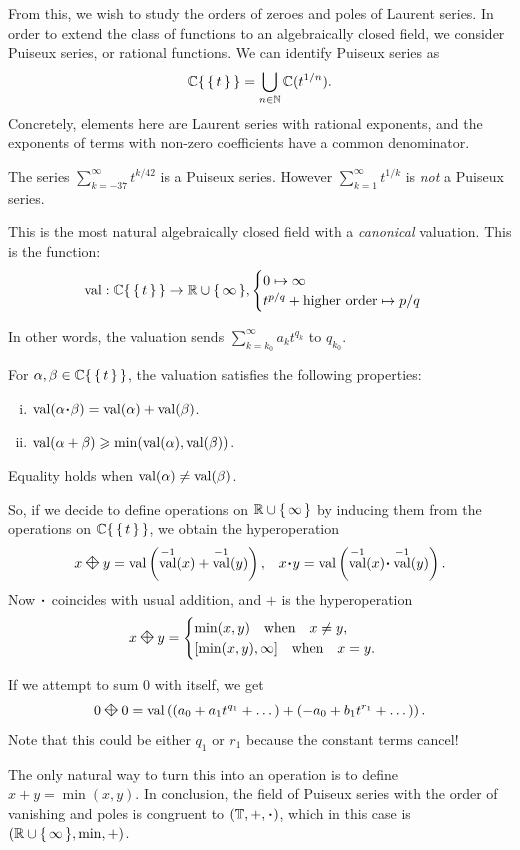 \documentclass[12pt]{memoir}
\DeclareMathOperator{\val}{val}
\newcommand{\diamondplus}{\mathbin{\rotatebox[origin=c]{45}{$\boxtimes$}}} %
\theoremstyle{definition}
\def\al{\alpha}
\begin{document}
From this, we wish to study the orders of zeroes and poles of Laurent series. In order to extend the class of functions to an algebraically closed field, we consider Puiseux series, or rational functions. We can identify Puiseux series as 
$$\mathbb{C}\{\,\{\,t\,\}\,\}=\bigcup_{n\in\mathbb{N}}\mathbb{C}(t^{1/n}).$$
Concretely, elements here are Laurent series with rational exponents, and the exponents of terms with non-zero coefficients have a common denominator. 
\begin{Ex}
    The series $\sum_{k=-37}^{\infty}t^{k/42}$ is a Puiseux series. However $\sum_{k=1}^\infty t^{1/k}$ is \emph{not} a Puiseux series.
\end{Ex}
This is the most natural algebraically closed field with a \emph{canonical} valuation. This is the function:
$$\val: \bC\set{\set{t}}\to\bR\cup\set{\infty},\begin{cases}
    0\mapsto\infty\\
    t^{p/q}+\text{higher order}\mapsto p/q
\end{cases}$$

In other words, the valuation sends $\sum_{k=k_0}^\infty a_kt^{q_k}$ to $q_{k_0}$.

\begin{Prop}\label{prop:PropertiesOfValuation}
For $\al,\bt\in\bC\set{\set{t}}$, the valuation satisfies the following properties:
\begin{enumerate}[i.]
    \item $\val(\al\.\bt)=\val(\al)+\val(\bt)$.
    \item $\val(\al+\bt)\geq\min(\val(\al),\val(\bt))$.
\end{enumerate}
Equality holds when $\val(\al)\neq\val(\bt)$.
\end{Prop}

So, if we decide to define operations on $\mathbb{R}\cup\{\,\infty\,\}$ by inducing them from the operations on $\mathbb{C}\{\,\{\,t\,\}\,\}$, we obtain the hyperoperation
\begin{align*}
    &x\diamondplus y=\val\left(\val^{-1}(x)+\val^{-1}(y)\right),
    &x\. y=\val\left(\val^{-1}(x)\.\val^{-1}(y)\right).
\end{align*}
Now $\.$ coincides with usual addition, and $+$ is the hyperoperation
$$x\diamondplus y=\begin{cases}
    \min(x,y)\word{when}x\neq y,\\
    [\min(x,y),\infty]\word{when}x=y.
\end{cases}$$
\begin{Ex}
    If we attempt to sum $0$ with itself, we get 
    $$0\diamondplus 0=\val\left((a_0+a_1t^{q_1}+\dots)+(-a_0+b_1t^{r_1}+\dots)\right).$$
    Note that this could be either $q_1$ or $r_1$ because the constant terms cancel! 
\end{Ex}
The only natural way to turn this into an operation is to define $x+y=\min(x,y)$. In conclusion, the field of Puiseux series with the order of vanishing and poles is congruent to $(\bT,+,\.)$, which in this case is $\left(\mathbb{R}\cup\{\,\infty\,\},\min,+\right)$.
\end{document}
